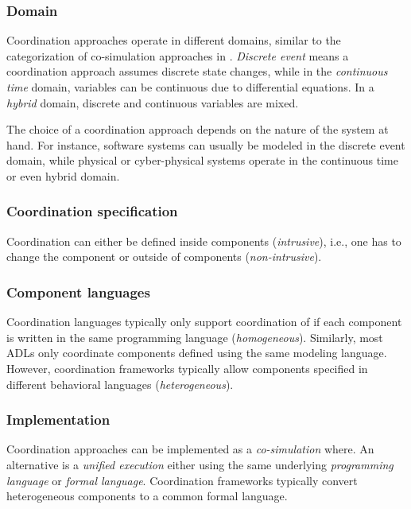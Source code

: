 \documentclass[runningheads]{llncs}
\begin{document}
\subsubsection{Domain} Coordination approaches operate in different domains, similar to the categorization of co-simulation approaches in \cite{gomesCoSimulationSurvey2019}.
\textit{Discrete event} means a coordination approach assumes discrete state changes, while in the \textit{continuous time} domain, variables can be continuous due to differential equations.
In a \textit{hybrid} domain, discrete and continuous variables are mixed.

The choice of a coordination approach depends on the nature of the system at hand.
For instance, software systems can usually be modeled in the discrete event domain, while physical or cyber-physical systems operate in the continuous time or even hybrid domain.

\subsubsection{Coordination specification} Coordination can either be defined inside components (\textit{intrusive}), i.e., one has to change the component or outside of components (\textit{non-intrusive}).


\subsubsection{Component languages} Coordination languages typically only support coordination of if each component is written in the same programming language (\textit{homogeneous}).
Similarly, most ADLs only coordinate components defined using the same modeling language.
However, coordination frameworks typically allow components specified in different behavioral languages (\textit{heterogeneous}).


\subsubsection{Implementation} Coordination approaches can be implemented as a \textit{co-simulation} where.
An alternative is a \textit{unified execution} either using the same underlying \textit{programming language} or \textit{formal language}.
Coordination frameworks typically convert heterogeneous components to a common formal language.
\end{document}
